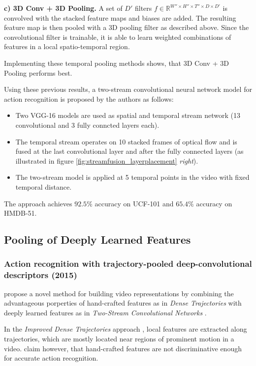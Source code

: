 \textbf{c) 3D Conv + 3D Pooling.}
A set of $D'$ filters $f \in \mathbb{R}^{W'' \times H'' \times T'' \times D \times D'}$ is convolved with the stacked feature maps and biases are added.
The resulting feature map is then pooled with a 3D pooling filter as described above.
Since the convolutional filter is trainable, it is able to learn weighted combinations of features in a local spatio-temporal region.

Implementing these temporal pooling methods shows, that 3D Conv + 3D Pooling performs best.

Using these previous results, a two-stream convolutional neural network model for action recognition is proposed by the authors as follows:
\begin{itemize}
    \item Two VGG-16 models \cite{simonyan_very_2014} are used as spatial and temporal stream network (13 convolutional and 3 fully conncted layers each).
    \item The temporal stream operates on 10 stacked frames of optical flow and is fused at the last convolutional layer and after the fully connected layers (as illustrated in figure \ref{fig:streamfusion_layerplacement} \textit{right}).
    \item The two-stream model is applied at 5 temporal points in the video with fixed temporal distance.
\end{itemize}

The approach achieves $92.5\%$ accuracy on UCF-101 and $65.4\%$ accuracy on HMDB-51.


\subsection{Pooling of Deeply Learned Features}

\subsubsection{Action recognition with trajectory-pooled deep-convolutional descriptors (2015)}
\textcite{wang_action_2015} propose a novel method for building video representations by combining the advantageous porperties of hand-crafted features as in \textit{Dense Trajectories} \cite{wang_action_2013} with deeply learned features as in \textit{Two-Stream Convolutional Networks} \cite{simonyan_two-stream_2014}.

In the \textit{Improved Dense Trajectories} approach \cite{wang_action_2013}, local features are extracted along trajectories, which are mostly located near regions of prominent motion in a video.
\textcite{wang_action_2015} claim however, that hand-crafted features are not discriminative enough for accurate action recognition.

